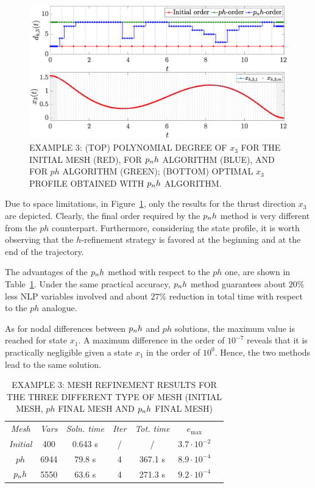 \begin{figure}[t]
	\centering
	\includegraphics[trim={1cm 0.1cm 2cm 1.05cm},clip,width=1.\linewidth]{Img/pnh1_free}
	\caption{EXAMPLE 3: (TOP) POLYNOMIAL DEGREE OF $x_{3}$ FOR THE INITIAL MESH (RED), FOR $p_{n}h$ ALGORITHM (BLUE), AND FOR $ph$ ALGORITHM (GREEN); (BOTTOM) OPTIMAL $x_3$ PROFILE OBTAINED WITH $p_{n}h$ ALGORITHM.}
	\label{fig:pnh1free}
\end{figure}

Due to space limitations, in Figure~\ref{fig:pnh1free}, only the results for the thrust direction $x_3$ are depicted. Clearly, the final order required by the $p_{n}h$ method is very different from the $ph$ counterpart. Furthermore, considering the state profile, it is worth observing that the $h$-refinement strategy is favored at the beginning and at the end of the trajectory.

The advantages of the $p_{n}h$ method with respect to the $ph$ one, are shown in Table~\ref{tab:tablefree}. Under the same practical accuracy, $p_{n}h$ method guarantees about $20\%$ less NLP variables involved and about $27\%$ reduction in total time with respect to the $ph$ analogue.

As for nodal differences between $p_{n}h$ and $ph$ solutions, the maximum value is reached for state $x_1$. A maximum difference in the order of $10^{-7}$ reveals that it is practically negligible given a state $x_1$ in the order of $10^0$. Hence, the two methods lead to the same solution.
\begin{table}[t]
	\caption{EXAMPLE 3: MESH REFINEMENT RESULTS FOR THE THREE DIFFERENT TYPE OF MESH (INITIAL MESH, $ph$ FINAL MESH AND $p_{n}h$ FINAL MESH)}
	\begin{center}
		\label{tab:tablefree}
		\begin{tabular}{c c c c c c c}
			& & \\ %
			\hline
			\emph{Mesh} & \emph{Vars} & \emph{Soln. time} & \emph{Iter} & \emph{Tot. time} & $e_\text{max}$ \\
			\hline
			\emph{Initial} & 400 & 0.643 s & / & / &  $3.7 \cdot 10^{-2}$\\
			$ph$  & 6944 & 79.8 s & 4 & 367.1 s & $8.9\cdot 10^{-4}$ \\
			$p_{n}h$ & 5550 & 63.6 s & 4 & 271.3 s & $9.2\cdot 10^{-4}$ \\
			\hline
		\end{tabular}
	\end{center}
\end{table}


